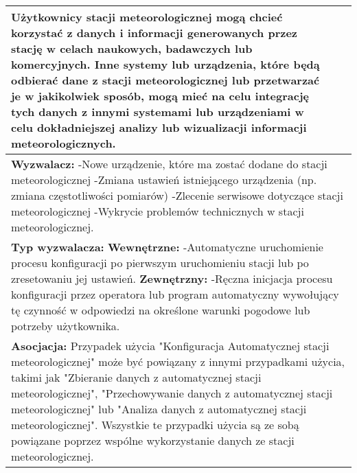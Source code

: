 \documentclass{article}
\begin{document}
\begin{center}
\begin{center}
\begin{tabular}{|l|l|l|}
{        \textbf{Użytkownicy} stacji meteorologicznej mogą chcieć korzystać z danych i informacji generowanych przez stację w celach naukowych, badawczych lub komercyjnych.
        \newline
        \textbf{Inne systemy lub urządzenia}, które będą odbierać dane z stacji meteorologicznej lub przetwarzać je w jakikolwiek sposób, mogą mieć na celu integrację tych danych z innymi systemami lub urządzeniami w celu dokładniejszej analizy lub wizualizacji informacji meteorologicznych.} \\
        \hline
        \hline
        \multicolumn{3}{|p{\dimexpr\linewidth-2\tabcolsep-2\arrayrulewidth}|}{\textbf{Wyzwalacz:}
        \newline
        -Nowe urządzenie, które ma zostać dodane do stacji meteorologicznej
        \newline
        -Zmiana ustawień istniejącego urządzenia (np. zmiana częstotliwości pomiarów)
        \newline
        -Zlecenie serwisowe dotyczące stacji meteorologicznej
        \newline
        -Wykrycie problemów technicznych w stacji meteorologicznej.} \\
        \hline
        \hline
        \multicolumn{3}{|p{\dimexpr\linewidth-2\tabcolsep-2\arrayrulewidth}|}{\textbf{Typ wyzwalacza:}
        \newline
        \textbf{Wewnętrzne:}
        \newline 
        -Automatyczne uruchomienie procesu konfiguracji po pierwszym uruchomieniu stacji lub po zresetowaniu jej ustawień. 
        \newline
        \textbf{Zewnętrzny:}
        \newline
        -Ręczna inicjacja procesu konfiguracji przez operatora lub program automatyczny wywołujący tę czynność w odpowiedzi na określone warunki pogodowe lub potrzeby użytkownika.} \\
        \hline
        \hline
        \multicolumn{3}{|p{\dimexpr\linewidth-2\tabcolsep-2\arrayrulewidth}|}{\textbf{Asocjacja:}
        \newline
        Przypadek użycia "Konfiguracja Automatycznej stacji meteorologicznej" może być powiązany
        z innymi przypadkami użycia, takimi jak "Zbieranie danych z automatycznej stacji meteorologicznej",
        "Przechowywanie danych z automatycznej stacji meteorologicznej" lub "Analiza danych z automatycznej stacji meteorologicznej".
        Wszystkie te przypadki użycia są ze sobą powiązane poprzez wspólne wykorzystanie danych ze stacji meteorologicznej.} \\

\end{tabular}
\end{center}
\end{center}
\end{document}
